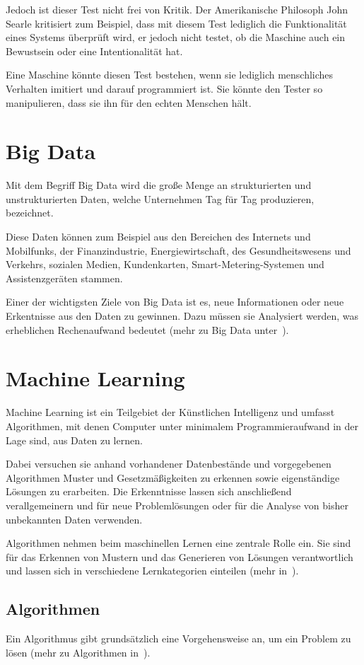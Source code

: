 Jedoch ist dieser Test nicht frei von Kritik. Der Amerikanische Philosoph John Searle kritisiert zum Beispiel, dass mit
diesem Test lediglich die Funktionalität eines Systems überprüft wird, er jedoch nicht testet, ob die Maschine auch ein
Bewustsein oder eine Intentionalität hat.

Eine Maschine könnte diesen Test bestehen, wenn sie lediglich menschliches Verhalten imitiert und darauf programmiert
ist. Sie könnte den Tester so manipulieren, dass sie ihn für den echten Menschen hält.

\section{Big Data}
Mit dem Begriff Big Data wird die große Menge an strukturierten und unstrukturierten Daten, welche Unternehmen Tag für
Tag produzieren, bezeichnet.

Diese Daten können zum Beispiel aus den Bereichen des Internets und Mobilfunks, der Finanzindustrie, Energiewirtschaft,
des Gesundheitswesens und Verkehrs, sozialen Medien, Kundenkarten, Smart-Metering-Systemen und Assistenzgeräten stammen.

Einer der wichtigsten Ziele von Big Data ist es, neue Informationen oder neue Erkentnisse aus den Daten zu gewinnen.
Dazu müssen sie Analysiert werden, was erheblichen Rechenaufwand bedeutet (mehr zu Big Data
unter~\cite{book_grundlagen_bigdata}).

\section{Machine Learning}
Machine Learning ist ein Teilgebiet der Künstlichen Intelligenz und umfasst Algorithmen, mit denen Computer unter
minimalem Programmieraufwand in der Lage sind, aus Daten zu lernen.

Dabei versuchen sie anhand vorhandener Datenbestände und vorgegebenen Algorithmen Muster und Gesetzmäßigkeiten zu
erkennen sowie eigenständige Lösungen zu erarbeiten. Die Erkenntnisse lassen sich anschließend verallgemeinern und für
neue Problemlösungen oder für die Analyse von bisher unbekannten Daten verwenden.

Algorithmen nehmen beim maschinellen Lernen eine zentrale Rolle ein. Sie sind für das Erkennen von Mustern und das
Generieren von Lösungen verantwortlich und lassen sich in verschiedene Lernkategorien einteilen
(mehr in~\cite{book_grundlagen_machinelearning}).

\subsection{Algorithmen}
Ein Algorithmus gibt grundsätzlich eine Vorgehensweise an, um ein Problem zu lösen (mehr zu Algorithmen
in~\cite{book_grundlagen_algorithmen}).

